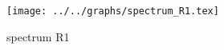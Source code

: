 \begin{figure}[h] \centering\texttt{[image: ../../graphs/spectrum\_R1.tex]}\caption{spectrum R1}\label{gr:spectrum_R1} \end{figure}
